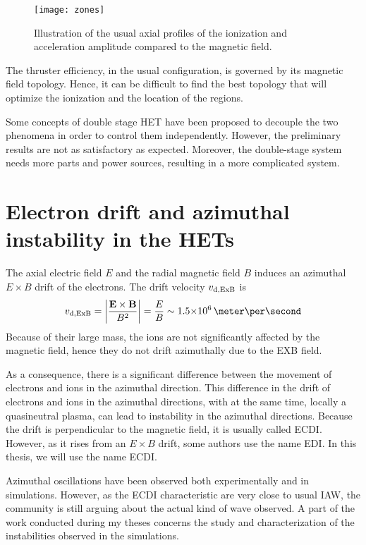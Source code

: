   \begin{figure}[hbtp]
    \centering
    \texttt{[image: zones]}
    \caption{Illustration of the usual axial profiles of the ionization and acceleration amplitude compared to the magnetic field.}
    \label{fig-zones}
  \end{figure}

  The thruster efficiency, in the usual configuration, is governed by its magnetic field topology.
  Hence, it can be difficult to find the best topology that will optimize the ionization and the location of the regions.

  Some concepts of double stage \ac{HET} have been proposed to decouple the two phenomena in order to control them independently.
  However, the preliminary results are not as satisfactory as expected. 
  Moreover, the double-stage system needs more parts and power sources, resulting in a more complicated system.

\section*{Electron drift and azimuthal instability in the HETs}

  The axial electric field $E$ and the radial magnetic field $B$ induces an azimuthal $E\times B$ drift of the electrons.
  The drift velocity $v_{\rm d, ExB}$ is 
  \begin{equation} \label{eq-exbdrift}
    v_{\rm d, ExB} = \bigg\lvert \frac{\vect{E} \times \vect{B}}{B^2} \bigg\rvert = \frac{E}{B} \sim \sn{1.5}{6} \,\meter\per\second
  \end{equation}
  Because of their large mass, the ions are not significantly affected by the magnetic field, hence they do not drift azimuthally due to the EXB field.

  As a consequence, there is a significant difference between the movement of electrons and ions in the azimuthal direction.
  This difference in the drift of electrons and ions in the azimuthal directions, with at the same time, locally a quasineutral plasma, can lead to instability in the azimuthal directions.
  Because the drift is perpendicular to the magnetic field, it is usually called \ac{ECDI}.
  However, as it rises from an $E\times B$ drift, some authors use the name \ac{EDI}.
  In this thesis, we will use the name \ac{ECDI}.

  Azimuthal oscillations have been observed both experimentally and in simulations.
  However, as the \ac{ECDI} characteristic are very close to usual \ac{IAW}, the community is still arguing about the actual kind of wave observed.
  A part of the work conducted during my theses concerns the study and characterization of the instabilities observed in the simulations.

